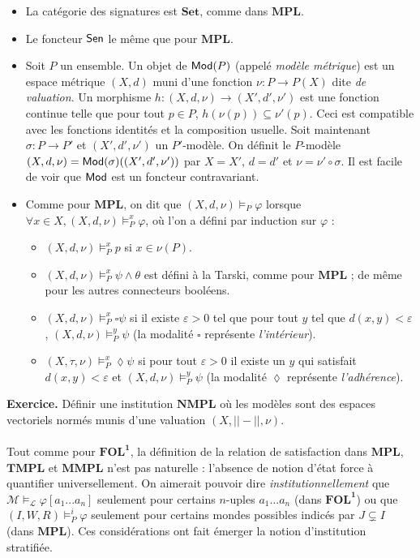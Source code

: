 \documentclass[11pt,a4paper]{article}
\newcommand{\La}{\mathcal{L}}
\newcommand{\M}{\mathcal{M}}
\newcommand{\ph}{\varphi}
\newcommand{\itemz}{\item[$\triangleright$]}
\newcommand{\gr}{\textbf}
\newcommand{\il}{\textit}
\newcommand{\info}[1]{\text{{\fontfamily{lmss}\selectfont #1}}}
\newcommand{\Mod}{\info{Mod}}
\newcommand{\Sen}{\info{Sen}}
\begin{document}
\begin{itemize}
\itemz La catégorie des signatures est $\gr{Set}$, comme dans $\gr{MPL}$.
\itemz Le foncteur $\Sen$ le même que pour $\gr{MPL}$.
\itemz Soit $P$ un ensemble. Un objet de $\Mod(P)$ (appelé \il{modèle métrique}) est un espace métrique $(X,d)$ muni d'une fonction $\nu : P \to P(X)$ dite \il{de valuation}. Un morphisme $h : (X,d,\nu) \to (X',d',\nu')$ est une fonction continue telle que pour tout $p \in P$, $h(\nu(p)) \subseteq \nu'(p)$. Ceci est compatible avec les fonctions identités et la composition usuelle. Soit maintenant $\sigma : P \to P'$ et $(X',d',\nu')$ un $P'$-modèle. On définit le $P$-modèle $(X,d,\nu) = \Mod(\sigma)((X',d',\nu'))$ par $X = X'$, $d = d'$ et $\nu = \nu' \circ \sigma$. Il est facile de voir que $\Mod$ est un foncteur contravariant.
\itemz Comme pour $\gr{MPL}$, on dit que $(X,d,\nu) \models_P \ph$ lorsque $\forall x \in X, (X,d,\nu) \models_P^x \ph$, où l'on a défini par induction sur $\ph$ :
\begin{itemize}
\setlength\itemsep{-0.3em}
\item $(X,d,\nu) \models_P^x p$ si $x \in \nu(P)$.
\item $(X,d,\nu) \models_P^x \psi \wedge \theta$ est défini à la Tarski, comme pour $\gr{MPL}$ ; de même pour les autres connecteurs booléens.
\item $(X,d,\nu) \models_P^x \square \psi$ si il existe $\varepsilon > 0$ tel que pour tout $y$ tel que $d(x,y) < \varepsilon$, $(X,d,\nu) \models_P^y \psi$ (la modalité $\square$ représente \il{l'intérieur}).
\item $(X,\tau,\nu) \models_P^x \lozenge \psi$ si pour tout $\varepsilon > 0$ il existe un $y$ qui satisfait $d(x,y) < \varepsilon$ et $(X,d,\nu) \models_P^y \psi$ (la modalité $\lozenge$ représente \il{l'adhérence}).
\end{itemize}
\end{itemize}
\gr{Exercice.} Définir une institution $\gr{NMPL}$ où les modèles sont des espaces vectoriels normés munis d'une valuation $(X,||-||,\nu)$.\\\\
Tout comme pour $\gr{FOL}^\gr{1}$, la définition de la relation de satisfaction dans $\gr{MPL}$, $\gr{TMPL}$ et $\gr{MMPL}$ n'est pas naturelle : l'absence de notion d'état force à quantifier universellement. On aimerait pouvoir dire \il{institutionnellement} que $\M \models_{\La} \ph[a_1...a_n]$ seulement pour certains $n$-uples $a_1...a_n$ (dans $\gr{FOL}^\gr{1}$) ou que $(I,W,R) \models_P^i \ph$ seulement pour certains mondes possibles indicés par $J \subsetneq I$ (dans $\gr{MPL}$). Ces considérations ont fait émerger la notion d'institution stratifiée.
\newpage
\end{document}
